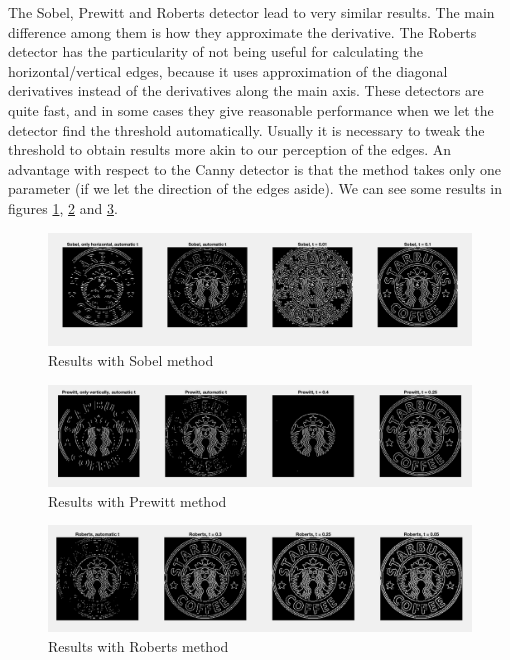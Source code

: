The Sobel, Prewitt and Roberts detector lead to very similar results. The main difference among them
is how they approximate the derivative. The Roberts detector has the particularity of not being useful
for calculating the horizontal/vertical edges, because it uses approximation of the diagonal
derivatives instead of the derivatives along the main axis. These detectors are quite fast, and in
some cases they give reasonable performance when we let the detector find the threshold automatically.
Usually it is necessary to tweak the threshold to obtain results more akin to our perception of
the edges. An advantage with respect to the Canny detector is that the method takes only one parameter
(if we let the direction of the edges aside). We can see some results in figures \ref{fig:im1},
\ref{fig:im2} and \ref{fig:im3}.

\begin{figure}[!hbt]
  \includegraphics[width=\textwidth]{./img/ex1/im1.png}
  \caption{Results with Sobel method}
  \label{fig:im1}
\end{figure}

\begin{figure}[!hbt]
  \includegraphics[width=\textwidth]{./img/ex1/im2.png}
  \caption{Results with Prewitt method}
  \label{fig:im2}
\end{figure}

\begin{figure}[!hbt]
  \includegraphics[width=\textwidth]{./img/ex1/im3.png}
  \caption{Results with Roberts method}
  \label{fig:im3}
\end{figure}

